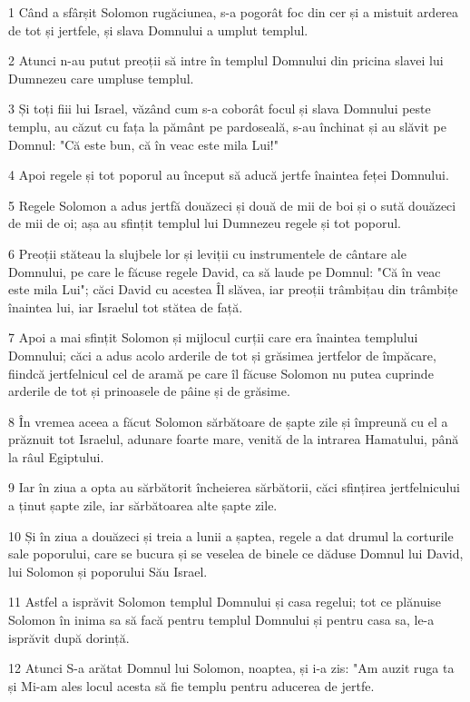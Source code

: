 \par 1 Când a sfârșit Solomon rugăciunea, s-a pogorât foc din cer și a mistuit arderea de tot și jertfele, și slava Domnului a umplut templul.
\par 2 Atunci n-au putut preoții să intre în templul Domnului din pricina slavei lui Dumnezeu care umpluse templul.
\par 3 Și toți fiii lui Israel, văzând cum s-a coborât focul și slava Domnului peste templu, au căzut cu fața la pământ pe pardoseală, s-au închinat și au slăvit pe Domnul: "Că este bun, că în veac este mila Lui!"
\par 4 Apoi regele și tot poporul au început să aducă jertfe înaintea feței Domnului.
\par 5 Regele Solomon a adus jertfă douăzeci și două de mii de boi și o sută douăzeci de mii de oi; așa au sfințit templul lui Dumnezeu regele și tot poporul.
\par 6 Preoții stăteau la slujbele lor și leviții cu instrumentele de cântare ale Domnului, pe care le făcuse regele David, ca să laude pe Domnul: "Că în veac este mila Lui"; căci David cu acestea Îl slăvea, iar preoții trâmbițau din trâmbițe înaintea lui, iar Israelul tot stătea de față.
\par 7 Apoi a mai sfințit Solomon și mijlocul curții care era înaintea templului Domnului; căci a adus acolo arderile de tot și grăsimea jertfelor de împăcare, fiindcă jertfelnicul cel de aramă pe care îl făcuse Solomon nu putea cuprinde arderile de tot și prinoasele de pâine și de grăsime.
\par 8 În vremea aceea a făcut Solomon sărbătoare de șapte zile și împreună cu el a prăznuit tot Israelul, adunare foarte mare, venită de la intrarea Hamatului, până la râul Egiptului.
\par 9 Iar în ziua a opta au sărbătorit încheierea sărbătorii, căci sfințirea jertfelnicului a ținut șapte zile, iar sărbătoarea alte șapte zile.
\par 10 Și în ziua a douăzeci și treia a lunii a șaptea, regele a dat drumul la corturile sale poporului, care se bucura și se veselea de binele ce dăduse Domnul lui David, lui Solomon și poporului Său Israel.
\par 11 Astfel a isprăvit Solomon templul Domnului și casa regelui; tot ce plănuise Solomon în inima sa să facă pentru templul Domnului și pentru casa sa, le-a isprăvit după dorință.
\par 12 Atunci S-a arătat Domnul lui Solomon, noaptea, și i-a zis: "Am auzit ruga ta și Mi-am ales locul acesta să fie templu pentru aducerea de jertfe.

